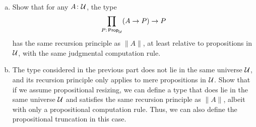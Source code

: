 \begin{exr}\fe${}$
    \begin{enumerate}[a),font=\upshape]
        \item Show that for any\/ $A\colon\univ$, the type
        \[
            \prod_{P\colon\fun{Prop}_\univ}(A\to P)\to P
        \]
        has the same recursion principle as\/ $\lVert A\rVert$, at least relative to propositions in\/ $\mathcal U$, with the same judgmental computation rule.
        \item The type considered in the previous part does not lie in the same universe\/ $\mathcal U$, and its recursion principle only applies to mere propositions in\/ $\mathcal U$. Show that if we assume propositional resizing, we can define a type that does lie in the same universe\/ $\mathcal U$ and satisfies the same recursion principle as\/ $\lVert A\rVert$, albeit with only a propositional computation rule. Thus, we can also define the propositional truncation in this case.
    \end{enumerate}
\end{exr}

